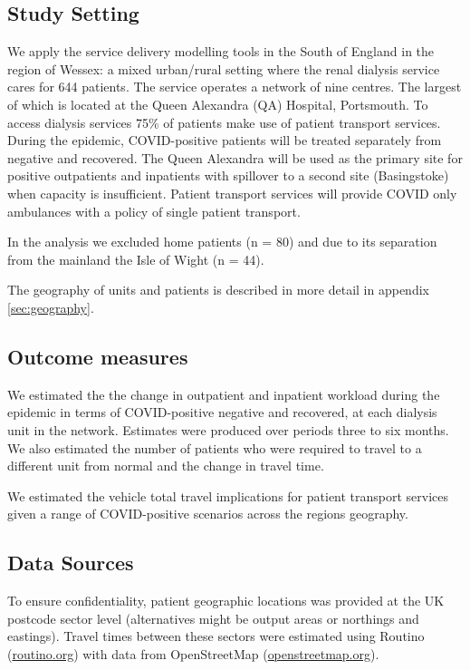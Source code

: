 \begin{multicols}{2}
\subsection{Study Setting}
We apply the service delivery modelling tools \cite{allen_michael_2020_3760626} in the South of England in the region of Wessex: a mixed urban/rural setting where the renal dialysis service cares for 644 patients. The service operates a network of nine centres.  The largest of which is located at the Queen Alexandra (QA) Hospital, Portsmouth. To access dialysis services 75\% of patients make use of patient transport services.  
During the epidemic, COVID-positive patients will be treated separately from negative and recovered. The Queen Alexandra will be used as the primary site for positive outpatients and inpatients with spillover to a second site (Basingstoke) when capacity is insufficient. Patient transport services will provide COVID only ambulances with a policy of single patient transport. 

In the analysis we excluded home patients (n = 80) and due to its separation from the mainland the Isle of Wight (n = 44). 

The geography of units and patients is described in more detail in appendix \ref{sec:geography}.

\subsection{Outcome measures}
We estimated the the change in outpatient and inpatient workload during the epidemic in terms of COVID-positive negative and recovered, at each dialysis unit in the network. Estimates were produced over periods three to six months. We also estimated the number of patients who were required to travel to a different unit from normal and the change in travel time.

We estimated the vehicle total travel implications for patient transport services given a range of COVID-positive scenarios across the regions geography.

\subsection{Data Sources}
To ensure confidentiality, patient geographic locations was provided at the UK postcode sector level (alternatives might be output areas or northings and eastings).  Travel times between these sectors were estimated using Routino (\url{routino.org}) with data from OpenStreetMap (\url{openstreetmap.org}). 


\end{multicols}
